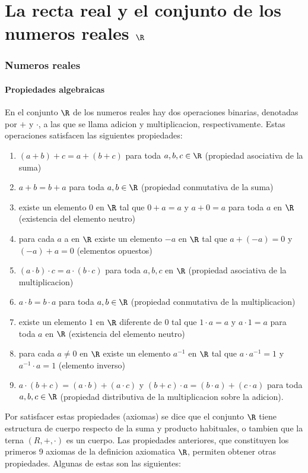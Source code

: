 \part{La recta real y el conjunto de los numeros reales \(\R \)}
\section{Numeros reales}
\subsection{Propiedades algebraicas}
En el conjunto \(\R \) de los numeros reales hay dos operaciones binarias, denotadas por \(+ \) y \(\cdot \), a las que se llama adicion y multiplicacion, respectivamente. Estas operaciones satisfacen las siguientes propiedades:
\begin{enumerate}
	\item \((a+ b) + c = a + (b + c )\) para toda \(a,b,c \in \R \) (propiedad asociativa de la suma)
	\item \(a + b = b + a \) para toda \(a,b \in \R \) (propiedad conmutativa de la suma)
	\item existe un elemento \(0 \) en \(\R \) tal que \(0 + a = a \) y \(a + 0 = a \) para toda \(a \) en \(\R \) (existencia del elemento neutro)
	\item para cada \(a \) a en \(\R \) existe un elemento \(-a \) en \(\R \) tal que \(a + (-a) = 0 \) y \((-a) + a = 0 \) (elementos opuestos)
	\item \((a \cdot b) \cdot c = a \cdot (b \cdot c )\) para toda \(a,b,c \) en \(\R \) (propiedad asociativa de la multiplicacion)
	\item \(a \cdot b = b \cdot a\) para toda \(a,b \in \R \) (propiedad conmutativa de la multiplicacion)
	\item existe un elemento \(1 \) en \(\R \) diferente de \(0 \) tal que \(1 \cdot a = a \) y \(a \cdot 1 = a \) para toda \(a \) en \(\R \) (existencia del elemento neutro)
	\item para cada \(a \neq 0 \) en \(\R \) existe un elemento \(a^{-1}\) en \(\R \) tal que \(a \cdot a^{-1} = 1 \) y \(a^{-1} \cdot a = 1 \) (elemento inverso)
	\item \(a \cdot (b + c) = (a \cdot b) + (a \cdot c )\) y \((b + c) \cdot a = (b \cdot a) + (c \cdot a )\) para toda \(a,b,c \in \R \) (propiedad distributiva de la multiplicacion sobre la adicion).
\end{enumerate}
Por satisfacer estas propiedades (axiomas) se dice que el conjunto \(\R \) tiene estructura de cuerpo respecto de la suma y producto habituales, o tambien que la terna \((R,+,\cdot )\) es un cuerpo. Las propiedades anteriores, que constituyen los primeros 9 axiomas de la definicion axiomatica \(\R \), permiten obtener otras propiedades. Algunas de estas son las siguientes:
